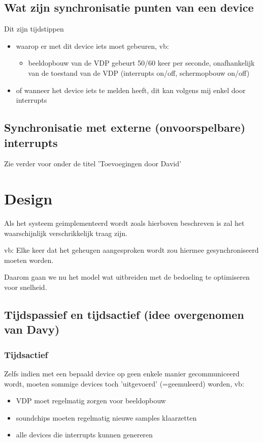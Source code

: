 \documentclass[11pt, a4paper]{report}
\begin{document}
\section{Wat zijn synchronisatie punten van een device}

Dit zijn tijdstippen 
\begin{itemize}
\item waarop er met dit device iets moet gebeuren, vb:
	\begin{itemize}
	\item beeldopbouw van de VDP gebeurt 50/60 keer per seconde,
	onafhankelijk van de toestand van de VDP (interrupts on/off,
	schermopbouw on/off)
	\end{itemize}
\item of wanneer het device iets te melden heeft, dit kan volgens mij enkel
door interrupts
\end{itemize}
    

\section{Synchronisatie met externe (onvoorspelbare) interrupts}
	
Zie verder voor onder de titel 'Toevoegingen door David'




\chapter{Design}

Als het systeem geimplementeerd wordt zoals hierboven beschreven is zal het 
waarschijnlijk verschrikkelijk traag zijn. 

vb: Elke keer dat het geheugen aangesproken wordt zou hiermee gesynchroniseerd
    moeten worden.

Daarom gaan we nu het model wat uitbreiden met de bedoeling te optimiseren 
voor snelheid.


\section{Tijdspassief en tijdsactief (idee overgenomen van Davy)}

\subsection{Tijdsactief}

Zelfs indien met een bepaald device op geen enkele manier gecommuniceerd wordt,
moeten sommige devices toch 'uitgevoerd' (=geemuleerd) worden, vb:
\begin{itemize}
\item VDP moet regelmatig zorgen voor beeldopbouw 
\item soundchips moeten regelmatig nieuwe samples klaarzetten 
\item alle devices die interrupts kunnen genereren
\end{itemize}
\end{document}

